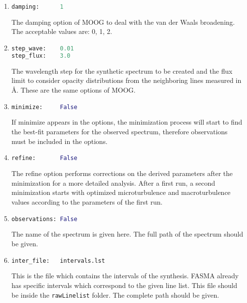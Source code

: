 \documentclass[a4paper,12pt]{article}
\begin{document}
\begin{enumerate}
\item
\begin{lstlisting}[language=Python]
damping:      1
\end{lstlisting}
The damping option of MOOG to deal with the van der Waals broadening. The acceptable values are: 0, 1, 2.

\item
\begin{lstlisting}[language=Python]
step_wave:    0.01
step_flux:    3.0
\end{lstlisting}
The wavelength step for the synthetic spectrum to be created and the flux limit to consider opacity distributions from the neighboring lines measured in \AA{}. These are the same options of MOOG.

\item
\begin{lstlisting}[language=Python]
minimize:     False
\end{lstlisting}
If minimize appears in the options, the minimization process will start to find the best-fit parameters for the observed spectrum, therefore observations must be included in the options.

\item
\begin{lstlisting}[language=Python]
refine:       False
\end{lstlisting}
The refine option performs corrections on the derived parameters after the minimization for a more detailed analysis. After a first run, a second minimization starts with optimized
microturbulence and macroturbulence values according to the parameters of the first run.

\item
\begin{lstlisting}[language=Python]
observations: False
\end{lstlisting}
The name of the spectrum is given here. The full path of the spectrum should be given.

\item
\begin{lstlisting}[language=Python]
inter_file:   intervals.lst
\end{lstlisting}
This is the file which contains the intervals of the synthesis. FASMA already has specific intervals which correspond to the given line list. This file should be inside the \texttt{rawLinelist} folder. 
The complete path should be given. 


\end{enumerate}
\end{document}

